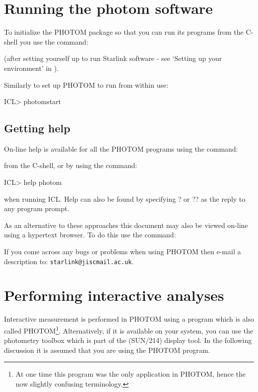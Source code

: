\documentclass[twoside,11pt,nolof]{starlink}
\begin{document}
\section{Running the photom software}

To initialize the PHOTOM package so that you can run its programs from
the C-shell you use the command:
\begin{terminalv}
\end{terminalv}
(after setting yourself up to run Starlink software -
see `Setting up your environment' in ).

Similarly to set up PHOTOM to run from within  use:
\begin{terminalv}
ICL> photomstart
\end{terminalv}

\subsection{Getting help}

On-line help is available for all the PHOTOM programs using the command:
\begin{terminalv}
\end{terminalv}
from the C-shell, or by using the command:
\begin{terminalv}
ICL> help photom
\end{terminalv}
when running ICL. Help can also be found by specifying ? or ?? as the
reply to any program prompt.

As an alternative to these approaches this document may also be viewed
on-line using a hypertext browser. To do this use the command:
\begin{terminalv}
\end{terminalv}

If you come across any bugs or problems when using PHOTOM then e-mail
a description to: \texttt{starlink@jiscmail.ac.uk}.

\section{Performing interactive analyses}

Interactive measurement is performed in
PHOTOM using a program which is also called PHOTOM\footnote{At one
time this program was the only application in PHOTOM, hence the
now slightly confusing terminology.}. Alternatively, if
it is available on your system, you can use the photometry
toolbox which is part of the  (SUN/214) display
tool. In the following discussion it is assumed that you are using
the PHOTOM program.
\end{document}
